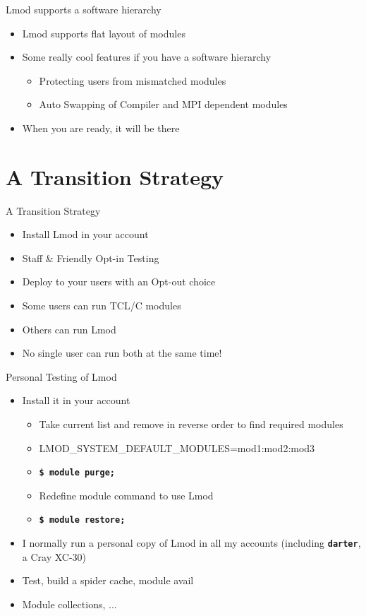 \documentclass{beamer}
\begin{document}
\begin{frame}{Lmod supports a software hierarchy}
  \begin{itemize}
    \item Lmod supports flat layout of modules
    \item Some really cool features if you have a software hierarchy
      \begin{itemize}
        \item Protecting users from mismatched modules
        \item Auto Swapping of Compiler and MPI dependent modules
      \end{itemize}
    \item When you are ready, it will be there
  \end{itemize}
\end{frame}

\section{A Transition Strategy}

\begin{frame}{A Transition Strategy}
  \begin{itemize}
    \item Install Lmod in your account
    \item Staff \& Friendly Opt-in Testing
    \item Deploy to your users with an Opt-out choice
    \item Some users can run TCL/C modules
    \item Others can run Lmod
    \item No single user can run both at the same time!
  \end{itemize}
\end{frame}

\begin{frame}{Personal Testing of Lmod}
  \begin{itemize}
    \item Install it in your account
      \begin{itemize}
        \item Take current list and remove in reverse order to find
          required modules
        \item LMOD\_SYSTEM\_DEFAULT\_MODULES=mod1:mod2:mod3
        \item \texttt{\bf \$ module purge;}
        \item Redefine module command to use Lmod
        \item \texttt{\bf \$ module restore;} 
      \end{itemize}
    \item I normally run a personal copy of Lmod in all my accounts
      (including \texttt{\bf darter}, a Cray XC-30)
    \item Test, build a spider cache, module avail
    \item Module collections, ...
  \end{itemize}
\end{frame}
\end{document}
